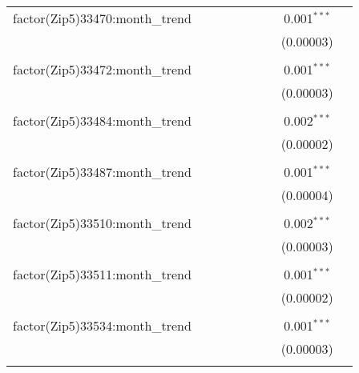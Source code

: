 \begin{table}[H]
{\begin{tabular}{@{\extracolsep{5pt}}lcccccccc}
  factor(Zip5)33470:month\_trend &  &  &  &  &  &  & 0.001$^{***}$ &  \\  

   &  &  &  &  &  &  & (0.00003) &  \\  

   & & & & & & & & \\  

  factor(Zip5)33472:month\_trend &  &  &  &  &  &  & 0.001$^{***}$ &  \\  

   &  &  &  &  &  &  & (0.00003) &  \\  

   & & & & & & & & \\  

  factor(Zip5)33484:month\_trend &  &  &  &  &  &  & 0.002$^{***}$ &  \\  

   &  &  &  &  &  &  & (0.00002) &  \\  

   & & & & & & & & \\  

  factor(Zip5)33487:month\_trend &  &  &  &  &  &  & 0.001$^{***}$ &  \\  

   &  &  &  &  &  &  & (0.00004) &  \\  

   & & & & & & & & \\  

  factor(Zip5)33510:month\_trend &  &  &  &  &  &  & 0.002$^{***}$ &  \\  

   &  &  &  &  &  &  & (0.00003) &  \\  

   & & & & & & & & \\  

  factor(Zip5)33511:month\_trend &  &  &  &  &  &  & 0.001$^{***}$ &  \\  

   &  &  &  &  &  &  & (0.00002) &  \\  

   & & & & & & & & \\  

  factor(Zip5)33534:month\_trend &  &  &  &  &  &  & 0.001$^{***}$ &  \\  

   &  &  &  &  &  &  & (0.00003) &  \\  

   & & & & & & & & \\  


\end{tabular}}
\end{table}
